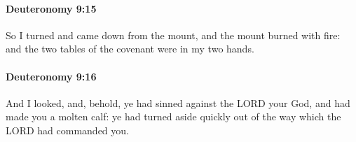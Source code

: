 		\paragraph{Deuteronomy 9:15} %
			\label{DEUTERONOMY-9-15}

			So I turned and came down from the mount, and the mount burned with fire: and the two tables of the covenant were in my two hands.


		\paragraph{Deuteronomy 9:16} %
			\label{DEUTERONOMY-9-16}

			And I looked, and, behold, ye had sinned against the LORD your God, and had made you a molten calf: ye had turned aside quickly out of the way which the LORD had commanded you.


